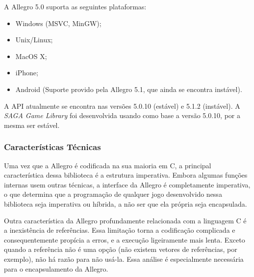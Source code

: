 \par
A Allegro 5.0 suporta as seguintes plataformas:
%
\begin{itemize}
 \item Windows (MSVC, MinGW);
 \item Unix/Linux;
 \item MacOS X;
 \item iPhone;
 \item Android (Suporte provido pela Allegro 5.1, que ainda se encontra instável).
\end{itemize}
%
A API atualmente se encontra nas versões 5.0.10 (estável) e 5.1.2 (instável). A \textit{SAGA Game Library} foi desenvolvida usando como base a versão 5.0.10, por a mesma ser estável.
\subsubsection{Características Técnicas}

Uma vez que a Allegro é codificada na sua maioria em C, a principal característica dessa biblioteca é a estrutura imperativa. Embora algumas funções internas usem outras técnicas, a interface da Allegro é completamente imperativa, o que determina que a programação de qualquer jogo desenvolvido nessa biblioteca seja imperativa ou híbrida, a não ser que ela própria seja encapsulada.

Outra característica da Allegro profundamente relacionada com a linguagem C é a inexistência de referências. Essa limitação torna a codificação complicada e consequentemente propícia a erros, e a execução ligeiramente mais lenta. Exceto quando a referência não é uma opção (não existem vetores de referências, por exemplo), não há razão para não usá-la. Essa análise é especialmente necessária para o encapsulamento da Allegro.
%
